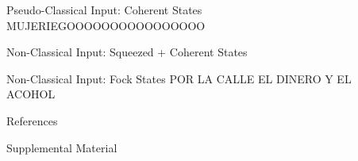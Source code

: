 \documentclass[final]{beamer}
\newlength{\sepwidth}
\newlength{\colwidth}
\newcommand{\separatorcolumn}{\begin{column}{\sepwidth}\end{column}}
\begin{document}
\begin{frame}[t]
\begin{columns}[t]
\begin{column}{\colwidth}
  \begin{exampleblock}{Pseudo-Classical Input: Coherent States}
MUJERIEGOOOOOOOOOOOOOOOO

  \end{exampleblock}


  \begin{exampleblock}{Non-Classical Input: Squeezed + Coherent States}

  \end{exampleblock}


  \begin{exampleblock}{Non-Classical Input: Fock States}
POR LA CALLE EL DINERO Y EL ACOHOL
  \end{exampleblock}


  \begin{block}{References}

    \nocite{*}
    \footnotesize{}

  \end{block}

  \begin{block}{Supplemental Material}

    

  \end{block}

\end{column}
\separatorcolumn
\end{columns}
\end{frame}
\end{document}
